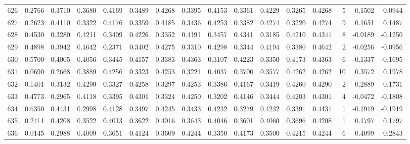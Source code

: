 \begin{tabular}{lrrrrrrrrrrrrrrr}
626 &      0.2766 &  0.3710 &  0.3680 &  0.4169 &  0.3489 &  0.4268 &  0.3395 &  0.4153 &  0.3361 &  0.4229 &   0.3265 &     0.4268 &      5 &                    0.1502 &                     0.0944 \\
627 &      0.2623 &  0.4110 &  0.3322 &  0.4176 &  0.3359 &  0.4185 &  0.3436 &  0.4253 &  0.3382 &  0.4274 &   0.3220 &     0.4274 &      9 &                    0.1651 &                     0.1487 \\
628 &      0.4530 &  0.3280 &  0.4211 &  0.3409 &  0.4226 &  0.3352 &  0.4191 &  0.3457 &  0.4341 &  0.3185 &   0.4210 &     0.4341 &      8 &                   -0.0189 &                    -0.1250 \\
629 &      0.4898 &  0.3942 &  0.4642 &  0.2371 &  0.3402 &  0.4275 &  0.3310 &  0.4298 &  0.3344 &  0.4194 &   0.3380 &     0.4642 &      2 &                   -0.0256 &                    -0.0956 \\
630 &      0.5700 &  0.4005 &  0.4056 &  0.3445 &  0.4157 &  0.3383 &  0.4363 &  0.3107 &  0.4223 &  0.3350 &   0.4173 &     0.4363 &      6 &                   -0.1337 &                    -0.1695 \\
631 &      0.0690 &  0.2668 &  0.3889 &  0.4256 &  0.3323 &  0.4253 &  0.3221 &  0.4037 &  0.3700 &  0.3577 &   0.4262 &     0.4262 &     10 &                    0.3572 &                     0.1978 \\
632 &      0.1401 &  0.3132 &  0.4290 &  0.3327 &  0.4258 &  0.3297 &  0.4253 &  0.3386 &  0.4167 &  0.3419 &   0.4260 &     0.4290 &      2 &                    0.2889 &                     0.1731 \\
633 &      0.4773 &  0.2965 &  0.4118 &  0.3395 &  0.4301 &  0.3324 &  0.4250 &  0.3202 &  0.4146 &  0.3444 &   0.4203 &     0.4301 &      4 &                   -0.0472 &                    -0.1808 \\
634 &      0.6350 &  0.4431 &  0.2998 &  0.4128 &  0.3497 &  0.4245 &  0.3433 &  0.4232 &  0.3279 &  0.4232 &   0.3391 &     0.4431 &      1 &                   -0.1919 &                    -0.1919 \\
635 &      0.2411 &  0.4208 &  0.3522 &  0.4013 &  0.3622 &  0.4016 &  0.3643 &  0.4046 &  0.3601 &  0.4060 &   0.3696 &     0.4208 &      1 &                    0.1797 &                     0.1797 \\
636 &      0.0145 &  0.2988 &  0.4009 &  0.3651 &  0.4124 &  0.3609 &  0.4244 &  0.3350 &  0.4173 &  0.3500 &   0.4215 &     0.4244 &      6 &                    0.4099 &                     0.2843 \\

\end{tabular}
